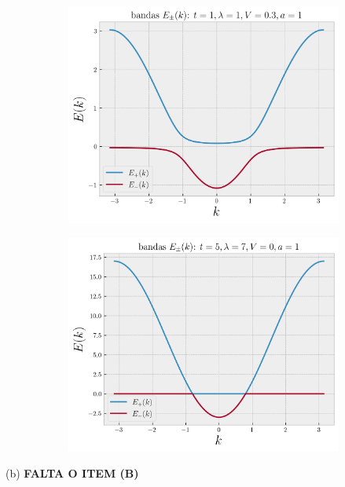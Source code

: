 \documentclass[a4paper,10pt]{article}
\begin{document}
\begin{figure}[H]
\centering
\begin{subfigure}{.46\textwidth}
  \centering
  \includegraphics[width=0.95\linewidth]{fig/bandas-anderson3.png}
  \label{fig:bandas-anderson3}
\end{subfigure}
\begin{subfigure}{.46\textwidth}
  \centering
  \includegraphics[width=0.95\linewidth]{fig/bandas-anderson4.png}
  \label{fig:bandas-anderson4}
\end{subfigure}
\label{fig:bandas-anderson12}
\end{figure}

(b) \textbf{FALTA O ITEM (B)}
\end{document}
